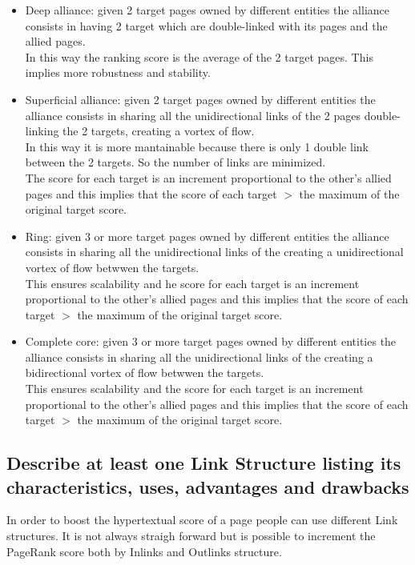 \begin{itemize}
    \item Deep alliance: given 2 target pages owned by different entities
    the alliance consists in having 2 target which are double-linked
    with its pages and the allied pages.\\ In this way the ranking score
    is the average of the 2 target pages. This implies more robustness
    and stability.
    \item Superficial alliance: given 2 target pages owned by different
    entities the alliance consists in sharing all the unidirectional links of the
    2 pages double-linking the 2 targets, creating a vortex of flow.\\
    In this way it is more mantainable because there is only 1 double
    link between the 2 targets. So the number of links are minimized.\\
    The score for each target is an increment proportional to the other's
    allied pages and this implies that the score of each target $>$ the
    maximum of the original target score.
    \item Ring: given 3 or more target pages owned by different
    entities the alliance consists in sharing all the unidirectional links of the
    creating a unidirectional vortex of flow betwwen the targets.\\
    This ensures scalability and he score for each target is an increment proportional to the other's
    allied pages and this implies that the score of each target $>$ the
    maximum of the original target score.
    \item Complete core: given 3 or more target pages owned by different
    entities the alliance consists in sharing all the unidirectional links of the
    creating a bidirectional vortex of flow betwwen the targets.\\
    This ensures scalability and the score for each target is an increment proportional to the other's
    allied pages and this implies that the score of each target $>$ the
    maximum of the original target score.
\end{itemize}

\subsection{Describe at least one Link Structure listing its characteristics, uses, advantages and drawbacks}
In order to boost the hypertextual score of a page people can use different Link structures.
It is not always straigh forward but is possible to increment the PageRank score both by Inlinks and Outlinks structure.

